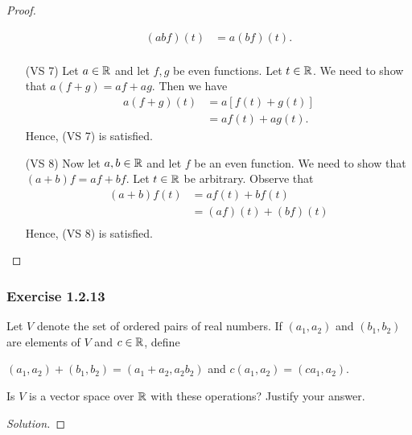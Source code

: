 \begin{proof}
\begin{enumerate}
\begin{align*}
                (ab  f)(t)  &= a (bf)(t).  \\
            \end{align*}
        \item[(VS 7)] Let \( a \in \mathbb{R}  \) and let \( f,g   \) be even functions. Let \( t \in \mathbb{R}  \). We need to show that \( a (f+g) = af + ag \). Then we have 
            \begin{align*}
                a(f+g)(t) &= a [ f(t) + g(t) ] \\
                          &= a f(t) + a g(t).
            \end{align*}
            Hence, (VS 7) is satisfied.
        \item[(VS 8)] Now let \( a,b \in \mathbb{R}  \) and let \( f  \) be an even function. We need to show that \(  (a+b) f =  a f + b f  \). Let \( t \in \mathbb{R}  \) be arbitrary.
            Observe that 
            \begin{align*}
                (a+b)f(t) &= a f(t) + b f(t)   \\
                          &=  (af)(t) + (bf)(t) \\
            \end{align*}
            Hence, (VS 8) is satisfied.
    \end{enumerate}
\end{proof}

\subsubsection{Exercise 1.2.13} Let \( V  \) denote the set of ordered pairs of real numbers. If \( (a_{1}, a_{2}) \) and \( (b_{1}, b_{2}) \) are elements of \( V  \) and \( c \in \mathbb{R}  \), define 
\begin{center}
    \( (a_{1}, a_{2} ) + (b_{1} , b_{2} ) = (a_{1} + a_{2} , a_{2} b_{2} ) \) and \( c (a_{1} , a_{2} ) = (ca_{1} , a_{2})  \).
\end{center}
Is \( V  \) is a vector space over \( \mathbb{R}  \) with these operations? Justify your answer.
\begin{proof}[Solution]

\end{proof}






